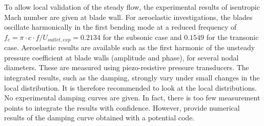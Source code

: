 To allow local validation of the steady
flow, the experimental results of 
isentropic Mach number are given at blade wall.
For aeroelastic investigations, the blades oscillate harmonically in the first bending mode
at a reduced frequency of $f_{c} =\pi \cdot c \cdot
f/U_{outlet, exp} = 0.2134$ for the subsonic case and $0.1549$ for the
transonic case. Aeroelastic
results are available such as the first harmonic of the unsteady pressure
coefficient at blade walls (amplitude and phase), for several nodal
diameters. These are measured using piezo-resistive pressure transducers.
The integrated
results, such as the damping, strongly vary under small changes in the
local distribution. It is therefore recommended to look at the local
distributions. No experimental damping curves are given. In fact,
there is too few measurement points to integrate the results with
confidence. However, \citet{Fransson1999}
provide numerical results of the damping curve obtained with a potential code.

